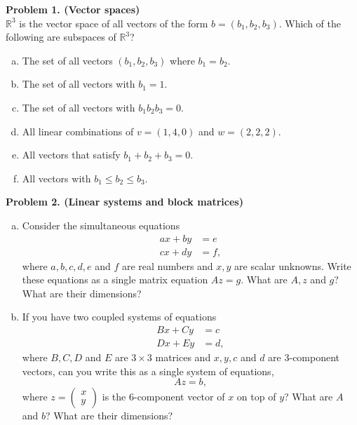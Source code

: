 \documentclass[11pt]{article}
\begin{document}
\noindent \textbf{Problem 1. (Vector spaces)}\\
$\mathbb{R}^3$ is the vector space of all vectors of the form $b = (b_1 , b_2 , b_3 )$. Which of the following are subspaces of $\mathbb{R}^3$?
\begin{enumerate}[(a)]
\item The set of all vectors $(b_1, b_2, b_3)$ where $b_1 = b_2$. 
\item The set of all vectors with $b_1 = 1$.
\item The set of all vectors with $b_1b_2b_3 = 0$.
\item All linear combinations of $v = (1, 4, 0)$ and $w = (2, 2, 2)$.
\item All vectors that satisfy $b_1 + b_2 + b_3 = 0$. 
\item All vectors with $b_1 \leq b_2 \leq b_3$.
\end{enumerate}

\vskip 100pt

\noindent \textbf{Problem 2. (Linear systems and block matrices)}\\
\begin{enumerate}[(a)]
\item Consider the simultaneous equations
\begin{align*}
ax + by &= e\\
cx + dy &= f,
\end{align*}
where $a,b,c,d,e$ and $f$ are real numbers and $x,y$ are scalar unknowns. Write these equations as a single matrix equation $Az = g$. What are $A, z$ and $g$? What are their dimensions?
\item If you have two coupled systems of equations
\begin{align*}
Bx + Cy &= c\\
Dx + Ey &= d,
\end{align*}
where $B, C, D$ and $E$ are $3 \times 3$ matrices and $x, y, c$ and $d$ are 3-component vectors, can you write this
as a single system of equations,
$$Az = b,$$
where $z = \begin{pmatrix} x \\ y \end{pmatrix}$ is the 6-component vector of $x$ on top of $y$? What are $A$ and $b$? What are their dimensions?
\end{enumerate}

\newpage 
\end{document}
